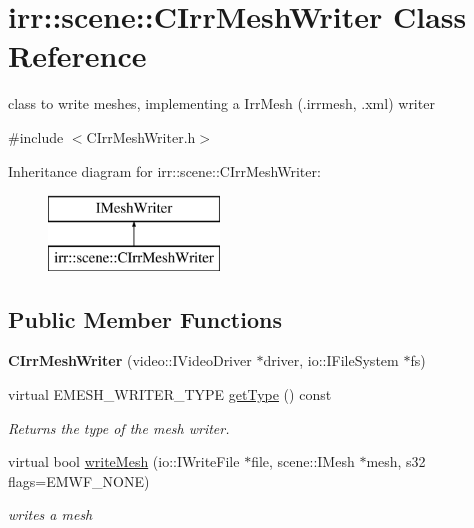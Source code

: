 \hypertarget{classirr_1_1scene_1_1_c_irr_mesh_writer}{\section{irr\-:\-:scene\-:\-:C\-Irr\-Mesh\-Writer Class Reference}
\label{classirr_1_1scene_1_1_c_irr_mesh_writer}
}


class to write meshes, implementing a Irr\-Mesh (.irrmesh, .xml) writer  




{\ttfamily \#include $<$C\-Irr\-Mesh\-Writer.\-h$>$}

Inheritance diagram for irr\-:\-:scene\-:\-:C\-Irr\-Mesh\-Writer\-:\begin{figure}[H]
\begin{center}
\leavevmode
\includegraphics[height=2.000000cm]{classirr_1_1scene_1_1_c_irr_mesh_writer}
\end{center}
\end{figure}
\subsection*{Public Member Functions}
\begin{DoxyCompactItemize}
\item 
\hypertarget{classirr_1_1scene_1_1_c_irr_mesh_writer_a7a06d4f23e8711725b0e7d4b399c630f}{{\bfseries C\-Irr\-Mesh\-Writer} (video\-::\-I\-Video\-Driver $\ast$driver, io\-::\-I\-File\-System $\ast$fs)}\label{classirr_1_1scene_1_1_c_irr_mesh_writer_a7a06d4f23e8711725b0e7d4b399c630f}

\item 
\hypertarget{classirr_1_1scene_1_1_c_irr_mesh_writer_a0f2f3c00f6b130cf861cf8b6612bf3c5}{virtual E\-M\-E\-S\-H\-\_\-\-W\-R\-I\-T\-E\-R\-\_\-\-T\-Y\-P\-E \hyperlink{classirr_1_1scene_1_1_c_irr_mesh_writer_a0f2f3c00f6b130cf861cf8b6612bf3c5}{get\-Type} () const }\label{classirr_1_1scene_1_1_c_irr_mesh_writer_a0f2f3c00f6b130cf861cf8b6612bf3c5}

\begin{DoxyCompactList}\small\item\em Returns the type of the mesh writer. \end{DoxyCompactList}\item 
\hypertarget{classirr_1_1scene_1_1_c_irr_mesh_writer_a5cc8dc8c8cf80ded85cfcd3e568302b9}{virtual bool \hyperlink{classirr_1_1scene_1_1_c_irr_mesh_writer_a5cc8dc8c8cf80ded85cfcd3e568302b9}{write\-Mesh} (io\-::\-I\-Write\-File $\ast$file, scene\-::\-I\-Mesh $\ast$mesh, s32 flags=E\-M\-W\-F\-\_\-\-N\-O\-N\-E)}\label{classirr_1_1scene_1_1_c_irr_mesh_writer_a5cc8dc8c8cf80ded85cfcd3e568302b9}

\begin{DoxyCompactList}\small\item\em writes a mesh \end{DoxyCompactList}\end{DoxyCompactItemize}
